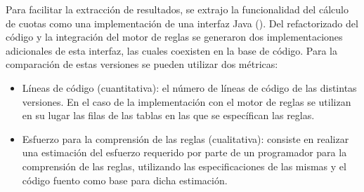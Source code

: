 Para facilitar la extracción de resultados, se extrajo la funcionalidad del cálculo de cuotas como una implementación de una interfaz Java (). Del refactorizado del código y la integración del motor de reglas se generaron dos implementaciones adicionales de esta interfaz, las cuales coexisten en la base de código. Para la comparación de estas versiones se pueden utilizar dos métricas:
\begin{itemize}
    \item Líneas de código (cuantitativa): el número de líneas de código de las distintas versiones. En el caso de la implementación con el motor de reglas se utilizan en su lugar las filas de las tablas en las que se específican las reglas.
    \item Esfuerzo para la comprensión de las reglas (cualitativa): consiste en realizar una estimación del esfuerzo requerido por parte de un programador para la comprensión de las reglas, utilizando las especificaciones de las mismas y el código fuento como base para dicha estimación.
\end{itemize}
